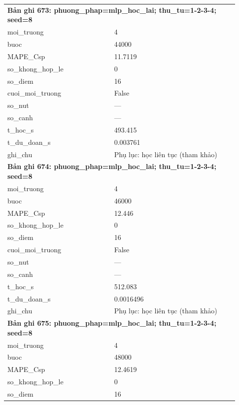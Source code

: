 \begin{longtable}{p{0.43\linewidth}p{0.50\linewidth}}
\midrule
\multicolumn{2}{p{0.95\linewidth}}{\textbf{Bản ghi 673: phuong\_phap=mlp\_hoc\_lai; thu\_tu=1-2-3-4; seed=8}} \\
moi\_\allowbreak truong & 4 \\
buoc & 44000 \\
MAPE\_\allowbreak Csp & 11.7119 \\
so\_\allowbreak khong\_\allowbreak hop\_\allowbreak le & 0 \\
so\_\allowbreak diem & 16 \\
cuoi\_\allowbreak moi\_\allowbreak truong & False \\
so\_\allowbreak nut & — \\
so\_\allowbreak canh & — \\
t\_\allowbreak hoc\_\allowbreak s & 493.415 \\
t\_\allowbreak du\_\allowbreak doan\_\allowbreak s & 0.003761 \\
ghi\_\allowbreak chu & Phụ lục: học liên tục (tham khảo) \\
\midrule
\multicolumn{2}{p{0.95\linewidth}}{\textbf{Bản ghi 674: phuong\_phap=mlp\_hoc\_lai; thu\_tu=1-2-3-4; seed=8}} \\
moi\_\allowbreak truong & 4 \\
buoc & 46000 \\
MAPE\_\allowbreak Csp & 12.446 \\
so\_\allowbreak khong\_\allowbreak hop\_\allowbreak le & 0 \\
so\_\allowbreak diem & 16 \\
cuoi\_\allowbreak moi\_\allowbreak truong & False \\
so\_\allowbreak nut & — \\
so\_\allowbreak canh & — \\
t\_\allowbreak hoc\_\allowbreak s & 512.083 \\
t\_\allowbreak du\_\allowbreak doan\_\allowbreak s & 0.0016496 \\
ghi\_\allowbreak chu & Phụ lục: học liên tục (tham khảo) \\
\midrule
\multicolumn{2}{p{0.95\linewidth}}{\textbf{Bản ghi 675: phuong\_phap=mlp\_hoc\_lai; thu\_tu=1-2-3-4; seed=8}} \\
moi\_\allowbreak truong & 4 \\
buoc & 48000 \\
MAPE\_\allowbreak Csp & 12.4619 \\
so\_\allowbreak khong\_\allowbreak hop\_\allowbreak le & 0 \\
so\_\allowbreak diem & 16 \\

\end{longtable}
